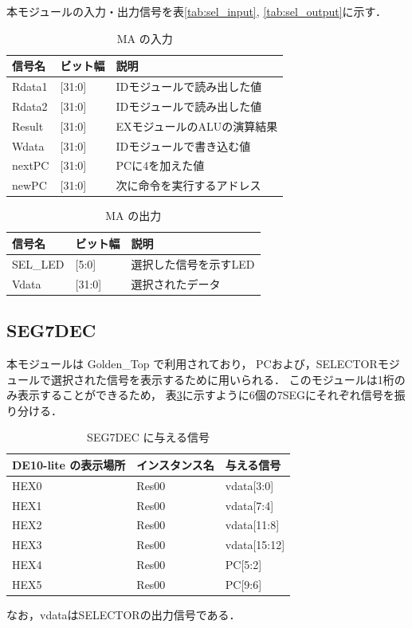 本モジュールの入力・出力信号を表\ref{tab:sel_input}, \ref{tab:sel_output}に示す．
\begin{table}[h]
  \caption{MA の入力}
  \centering
  \begin{tabular}{l|l|l}
    信号名 & ビット幅 & 説明 \\
    \hline
    Rdata1 & [31:0] & IDモジュールで読み出した値 \\
    Rdata2 & [31:0] & IDモジュールで読み出した値 \\
    Result & [31:0] & EXモジュールのALUの演算結果 \\
    Wdata & [31:0] & IDモジュールで書き込む値 \\
    nextPC & [31:0] & PCに4を加えた値 \\
    newPC & [31:0] & 次に命令を実行するアドレス \\
  \end{tabular}
  \label{tab:ma_input}
\end{table}
\begin{table}[h]
  \caption{MA の出力}
  \centering
  \begin{tabular}{l|l|l}
    信号名 & ビット幅 & 説明 \\
    \hline
    SEL\_LED & [5:0] & 選択した信号を示すLED \\
    Vdata & [31:0] & 選択されたデータ \\
  \end{tabular}
  \label{tab:ma_output}
\end{table}

\subsection{SEG7DEC}
本モジュールは Golden\_Top で利用されており，
PCおよび，SELECTORモジュールで選択された信号を表示するために用いられる．
このモジュールは1桁のみ表示することができるため，
表\ref{tab:7seg}に示すように6個の7SEGにそれぞれ信号を振り分ける．
\begin{table}
  \caption{SEG7DEC に与える信号}
  \centering
  \begin{tabular}{l|l|l}
    DE10-lite の表示場所 & インスタンス名 & 与える信号 \\
    \hline
    HEX0 & Res00 & vdata[3:0] \\
    HEX1 & Res00 & vdata[7:4] \\
    HEX2 & Res00 & vdata[11:8] \\
    HEX3 & Res00 & vdata[15:12] \\
    HEX4 & Res00 & PC[5:2] \\
    HEX5 & Res00 & PC[9:6] \\
  \end{tabular}
  \label{tab:7seg}
\end{table}
なお，vdataはSELECTORの出力信号である．

